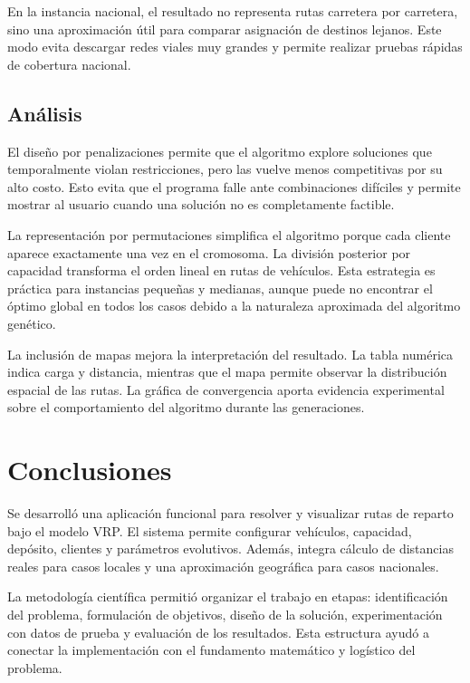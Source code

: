 \documentclass[runningheads]{llncs}
\begin{document}
En la instancia nacional, el resultado no representa rutas carretera por carretera, sino una aproximación útil para comparar asignación de destinos lejanos. Este modo evita descargar redes viales muy grandes y permite realizar pruebas rápidas de cobertura nacional.

\subsection{Análisis}

El diseño por penalizaciones permite que el algoritmo explore soluciones que temporalmente violan restricciones, pero las vuelve menos competitivas por su alto costo. Esto evita que el programa falle ante combinaciones difíciles y permite mostrar al usuario cuando una solución no es completamente factible.

La representación por permutaciones simplifica el algoritmo porque cada cliente aparece exactamente una vez en el cromosoma. La división posterior por capacidad transforma el orden lineal en rutas de vehículos. Esta estrategia es práctica para instancias pequeñas y medianas, aunque puede no encontrar el óptimo global en todos los casos debido a la naturaleza aproximada del algoritmo genético.

La inclusión de mapas mejora la interpretación del resultado. La tabla numérica indica carga y distancia, mientras que el mapa permite observar la distribución espacial de las rutas. La gráfica de convergencia aporta evidencia experimental sobre el comportamiento del algoritmo durante las generaciones.

\section{Conclusiones}

Se desarrolló una aplicación funcional para resolver y visualizar rutas de reparto bajo el modelo VRP. El sistema permite configurar vehículos, capacidad, depósito, clientes y parámetros evolutivos. Además, integra cálculo de distancias reales para casos locales y una aproximación geográfica para casos nacionales.

La metodología científica permitió organizar el trabajo en etapas: identificación del problema, formulación de objetivos, diseño de la solución, experimentación con datos de prueba y evaluación de los resultados. Esta estructura ayudó a conectar la implementación con el fundamento matemático y logístico del problema.
\end{document}
